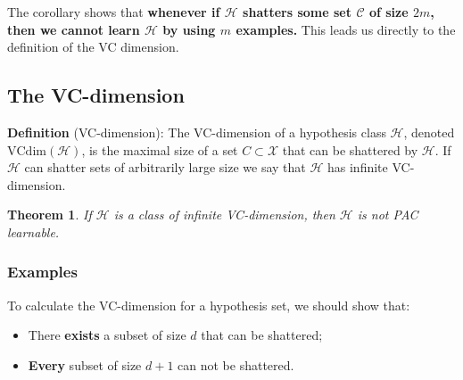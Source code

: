\documentclass{article}
\newtheorem{theorem}{Theorem}
\begin{document}
The corollary shows that \textbf{whenever if $\mathcal{H}$ shatters some set $\mathcal{C}$ of size $2m$, then we cannot learn $\mathcal{H}$ by using $m$ examples.} This leads us directly to the definition of the VC dimension.

\subsection{The VC-dimension}
\textbf{Definition} (VC-dimension): The VC-dimension of a hypothesis class $\mathcal{H}$, denoted $\mathrm{VCdim}(\mathcal{H})$, is the maximal size of a set $C\subset\mathcal{X}$ that can be shattered by $\mathcal{H}$. If $\mathcal{H}$ can shatter sets of arbitrarily large size we say that $\mathcal{H}$ has infinite VC-dimension.

\begin{theorem}
If $\mathcal{H}$ is a class of infinite VC-dimension, then $\mathcal{H}$ is not PAC learnable.
\end{theorem}

\subsubsection{Examples}

	To calculate the VC-dimension for a hypothesis set, we should show that:
	\begin{itemize}
	\item There \textbf{exists} a subset of size $d$ that can be shattered;
	\item \textbf{Every} subset of size $d+1$ can not be shattered.
	\end{itemize}
	
\end{document}
